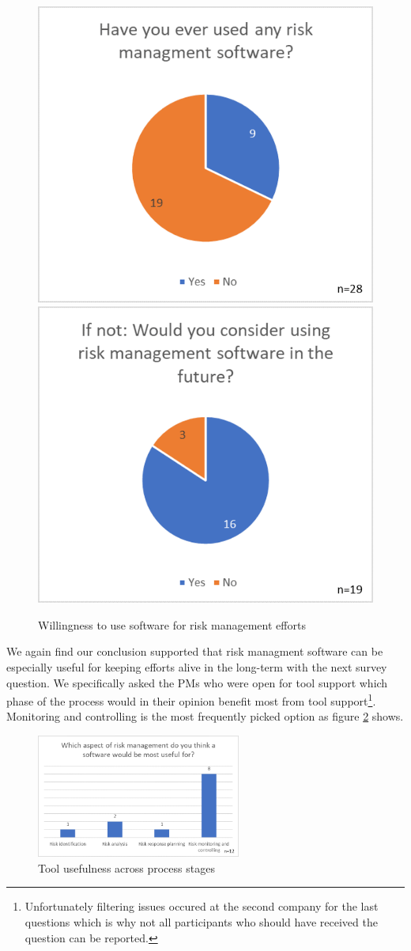 \begin{figure}[H]
	\centering
	\includegraphics[width=.45\textwidth]{Assets/survey_results/Q5.png}
	\includegraphics[width=.45\textwidth]{Assets/survey_results/Q6.png}
	\caption{Willingness to use software for risk management efforts}
	\label{fig:label24}
\end{figure}

We again find our conclusion supported that risk managment software can be especially useful for keeping efforts alive in the long-term with the next survey question. We specifically asked the PMs who were open for tool support which phase of the process would in their opinion benefit most from tool support\footnote{Unfortunately filtering issues occured at the second company for the last questions which is why not all participants who should have received the question can be reported.}. Monitoring and controlling is the most frequently picked option as figure \ref{fig:label25} shows. 

\begin{figure}[H]
	\centering
	\includegraphics[width=0.6\textwidth]{Assets/survey_results/Q8.png}
	\caption{Tool usefulness across process stages}
	\label{fig:label25}
\end{figure}


